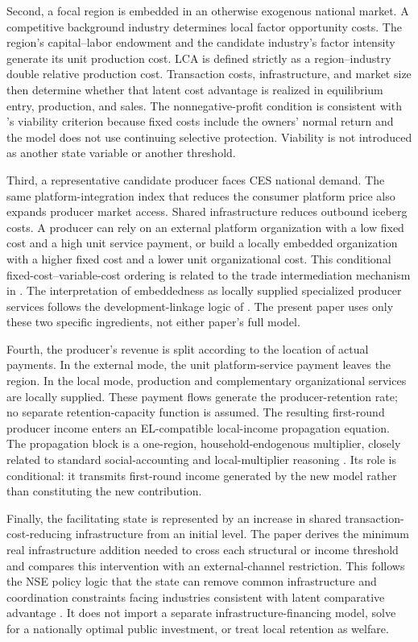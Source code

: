 \documentclass[11pt]{article}
\theoremstyle{definition}
\theoremstyle{remark}
\begin{document}
Second, a focal region is embedded in an otherwise exogenous national market.
A competitive background industry determines local factor opportunity costs.
The region's capital--labor endowment and the candidate industry's factor
intensity generate its unit production cost.  LCA is defined strictly as a
region--industry double relative production cost.  Transaction costs,
infrastructure, and market size then determine whether that latent cost
advantage is realized in equilibrium entry, production, and sales.  The
nonnegative-profit condition is consistent with \citet{Lin2003}'s viability
criterion because fixed costs include the owners' normal return and the model
does not use continuing selective protection.  Viability is not introduced as
another state variable or another threshold.

Third, a representative candidate producer faces CES national demand.  The
same platform-integration index that reduces the consumer platform price also
expands producer market access.  Shared infrastructure reduces outbound
iceberg costs.  A producer can rely on an external platform organization with
a low fixed cost and a high unit service payment, or build a locally embedded
organization with a higher fixed cost and a lower unit organizational cost.
This conditional fixed-cost--variable-cost ordering is related to the trade
intermediation mechanism in \citet{AhnKhandelwalWei2011}.  The interpretation
of embeddedness as locally supplied specialized producer services follows the
development-linkage logic of \citet{RodriguezClare1996}.  The present paper
uses only these two specific ingredients, not either paper's full model.

Fourth, the producer's revenue is split according to the location of actual
payments.  In the external mode, the unit platform-service payment leaves the
region.  In the local mode, production and complementary organizational
services are locally supplied.  These payment flows generate the
producer-retention rate; no separate retention-capacity function is assumed.
The resulting first-round producer income enters an EL-compatible
local-income propagation equation.  The propagation block is a one-region,
household-endogenous multiplier, closely related to standard social-accounting
and local-multiplier reasoning \citep{MillerBlair2009,Moretti2010}.  Its role
is conditional: it transmits first-round income generated by the new model
rather than constituting the new contribution.

Finally, the facilitating state is represented by an increase in shared
transaction-cost-reducing infrastructure from an initial level.  The paper
derives the minimum real infrastructure addition needed to cross each
structural or income threshold and compares this intervention with an
external-channel restriction.  This follows the NSE policy logic that the
state can remove common infrastructure and coordination constraints facing
industries consistent with latent comparative advantage
\citep{Lin2011,Lin2012,LinMonga2010}.  It does not import a separate
infrastructure-financing model, solve for a nationally optimal public
investment, or treat local retention as welfare.
\end{document}
